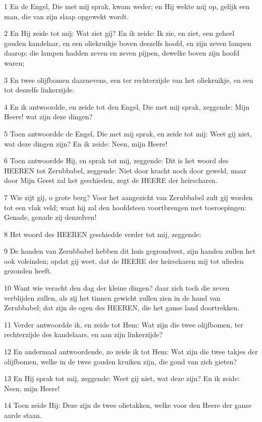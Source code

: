 \par 1 En de Engel, Die met mij sprak, kwam weder; en Hij wekte mij op, gelijk een man, die van zijn slaap opgewekt wordt.
\par 2 En Hij zeide tot mij: Wat ziet gij? En ik zeide: Ik zie, en ziet, een geheel gouden kandelaar, en een oliekruikje boven deszelfs hoofd, en zijn zeven lampen daarop; die lampen hadden zeven en zeven pijpen, dewelke boven zijn hoofd waren;
\par 3 En twee olijfbomen daarnevens, een ter rechterzijde van het oliekruikje, en een tot deszelfs linkerzijde.
\par 4 En ik antwoordde, en zeide tot den Engel, Die met mij sprak, zeggende: Mijn Heere! wat zijn deze dingen?
\par 5 Toen antwoordde de Engel, Die met mij sprak, en zeide tot mij: Weet gij niet, wat deze dingen zijn? En ik zeide: Neen, mijn Heere!
\par 6 Toen antwoordde Hij, en sprak tot mij, zeggende: Dit is het woord des HEEREN tot Zerubbabel, zeggende: Niet door kracht noch door geweld, maar door Mijn Geest zal het geschieden, zegt de HEERE der heirscharen.
\par 7 Wie zijt gij, o grote berg? Voor het aangezicht van Zerubbabel zult gij worden tot een vlak veld; want hij zal den hoofdsteen voortbrengen met toeroepingen: Genade, genade zij denzelven!
\par 8 Het woord des HEEREN geschiedde verder tot mij, zeggende:
\par 9 De handen van Zerubbabel hebben dit huis gegrondvest, zijn handen zullen het ook voleinden; opdat gij weet, dat de HEERE der heirscharen mij tot ulieden gezonden heeft.
\par 10 Want wie veracht den dag der kleine dingen? daar zich toch die zeven verblijden zullen, als zij het tinnen gewicht zullen zien in de hand van Zerubbabel; dat zijn de ogen des HEEREN, die het ganse land doortrekken.
\par 11 Verder antwoordde ik, en zeide tot Hem: Wat zijn die twee olijfbomen, ter rechterzijde des kandelaars, en aan zijn linkerzijde?
\par 12 En andermaal antwoordende, zo zeide ik tot Hem: Wat zijn die twee takjes der olijfbomen, welke in de twee gouden kruiken zijn, die goud van zich gieten?
\par 13 En Hij sprak tot mij, zeggende: Weet gij niet, wat deze zijn? En ik zeide: Neen, mijn Heere!
\par 14 Toen zeide Hij: Deze zijn de twee olietakken, welke voor den Heere der ganse aarde staan.

